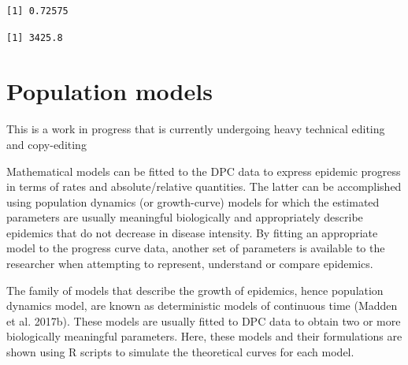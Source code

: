 \documentclass[
  letterpaper,
  DIV=11,
  numbers=noendperiod]{scrreprt}
\newenvironment{Shaded}{\begin{snugshade}}{\end{snugshade}}
\newcommand{\AttributeTok}[1]{\textcolor[rgb]{0.40,0.45,0.13}{#1}}
\newcommand{\CommentTok}[1]{\textcolor[rgb]{0.37,0.37,0.37}{#1}}
\newcommand{\ConstantTok}[1]{\textcolor[rgb]{0.56,0.35,0.01}{#1}}
\newcommand{\FunctionTok}[1]{\textcolor[rgb]{0.28,0.35,0.67}{#1}}
\newcommand{\NormalTok}[1]{\textcolor[rgb]{0.00,0.23,0.31}{#1}}
\newcommand{\SpecialCharTok}[1]{\textcolor[rgb]{0.37,0.37,0.37}{#1}}
\begin{document}
\begin{verbatim}
[1] 0.72575
\end{verbatim}

\begin{Shaded}
\end{Shaded}

\begin{verbatim}
[1] 3425.8
\end{verbatim}

\hypertarget{population-models}{%
\chapter{Population models}\label{population-models}}

\begin{tcolorbox}[enhanced jigsaw, rightrule=.15mm, left=2mm, breakable, colframe=quarto-callout-note-color-frame, toprule=.15mm, leftrule=.75mm, bottomrule=.15mm, colback=white, arc=.35mm, opacityback=0]
\begin{minipage}[t]{5.5mm}
\textcolor{quarto-callout-note-color}{\faInfo}
\end{minipage}%
\begin{minipage}[t]{\textwidth - 5.5mm}
This is a work in progress that is currently undergoing heavy technical
editing and copy-editing\end{minipage}%
\end{tcolorbox}

Mathematical models can be fitted to the DPC data to express epidemic
progress in terms of rates and absolute/relative quantities. The latter
can be accomplished using population dynamics (or growth-curve) models
for which the estimated parameters are usually meaningful biologically
and appropriately describe epidemics that do not decrease in disease
intensity. By fitting an appropriate model to the progress curve data,
another set of parameters is available to the researcher when attempting
to represent, understand or compare epidemics.

The family of models that describe the growth of epidemics, hence
population dynamics model, are known as deterministic models of
continuous time (Madden et al. 2017b). These models are usually fitted
to DPC data to obtain two or more biologically meaningful parameters.
Here, these models and their formulations are shown using R scripts to
simulate the theoretical curves for each model.
\end{document}
